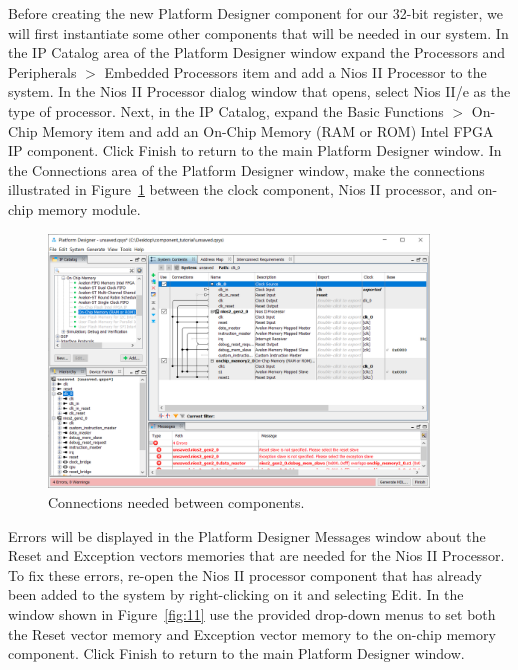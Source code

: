 \documentclass[11pt, twoside, pdftex]{article}
\begin{document}
Before creating the new Platform Designer component for our 32-bit register, we will 
first instantiate some other components that will be needed in our system. In the {\sf IP Catalog} area of the Platform Designer window expand the
{\sf Processors and Peripherals $>$ Embedded Processors} item and add a {\sf Nios II Processor} to the system. In the Nios II
Processor dialog window that opens, select {\sf Nios II/e} as the type of processor. 
Next, in the {\sf IP Catalog}, expand the {\sf Basic Functions $>$ On-Chip Memory} item and add an {\sf On-Chip Memory (RAM or ROM) Intel FPGA IP} component.
Click {\sf Finish} to return to the main Platform Designer window. In the {\sf Connections} area of the Platform Designer
window, make the connections illustrated in Figure~\ref{fig:10} between 
the clock component, Nios II processor, and on-chip memory module. 

\begin{figure}[H]
   \begin{center}
        \includegraphics[width=0.9\textwidth]{figures/figure10.png}
   \end{center}
   \caption{Connections needed between components.}
	\label{fig:10}
\end{figure}

\newpage
Errors will be displayed in the Platform Designer {\sf Messages} window about the Reset and Exception
vectors memories that are needed for the Nios II Processor. To fix these errors, re-open the
Nios II processor component that has already been added to the system by right-clicking on it and selecting {\sf Edit}.
In the window shown in Figure~\ref{fig:11} use the provided drop-down menus to set both
the Reset vector memory and Exception vector memory to the on-chip memory component.
Click {\sf Finish} to return to the main Platform Designer window.
\end{document}
